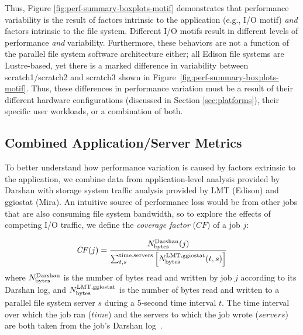 Thus, Figure \ref{fig:perf-summary-boxplots-motif} demonstrates that performance variability is the result of factors intrinsic to the application (e.g., I/O motif) \emph{and} factors intrinsic to the file system. 
Different I/O motifs result in different levels of performance \emph{and} variability.
Furthermore, these behaviors are not a function of the parallel file system software architecture either; all Edison file systems are Lustre-based, yet there is a marked difference in variability between scratch1/scratch2 and scratch3 shown in Figure~\ref{fig:perf-summary-boxplots-motif}.
Thus, these differences in performance variation must be a result of their different hardware configurations (discussed in Section \ref{sec:platforms}), their specific user workloads, or a combination of both.

\subsection{Combined Application/Server Metrics} \label{sec:results/combining}

To better understand how performance variation is caused by factors extrinsic to the application, we combine data from application-level analysis provided by Darshan with storage system traffic analysis provided by LMT (Edison) and ggiostat (Mira).
An intuitive source of performance loss would be from other jobs that are also consuming file system bandwidth, so to explore the effects of competing I/O traffic, we define the \emph{coverage factor} ($\mathit{CF}$) of a job $j$:

\begin{equation} \label{eq:cf}
    \mathit{CF}(j) = \frac{N_{\textup{bytes}}^{\textup{Darshan}}(j)}
    {\sum_{t,s}^{\textup{time,servers}}
    \left [ N_{\textup{bytes}}^{\textup{LMT,ggiostat}}(t,s) \right ] }
\end{equation}
%
where $N_{\textup{bytes}}^{\textup{Darshan}}$ is the number of bytes read and written by job $j$ according to its Darshan log, and $N_{\textup{bytes}}^{\textup{LMT,ggiostat}}$ is the number of bytes read and written to a parallel file system server $s$ during a 5-second time interval $t$.
The time interval over which the job ran ($\mathit{time}$) and the servers to which the job wrote ($\mathit{servers}$) are both taken from the job's Darshan log~\cite{snyder2016modular}.

